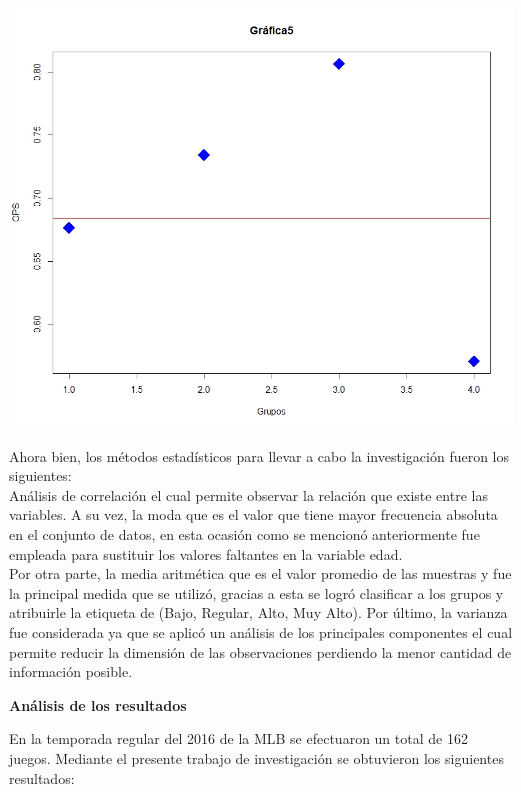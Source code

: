 \documentclass[11pt,letterpaper]{report}
\begin{document}
\begin{center}
    	\includegraphics[scale=0.4]{Grafica5.jpeg} 
    \end{center} \newpage
    
     Ahora bien, los métodos estadísticos para llevar a cabo la investigación fueron los siguientes: \\ 
     
     Análisis de correlación el cual permite observar la relación que existe entre las variables. A su vez, la moda que es el valor que tiene mayor frecuencia absoluta en el conjunto de datos, en esta ocasión como se mencionó anteriormente fue empleada para sustituir los valores faltantes en la variable edad. \\
     
     Por otra parte, la media aritmética que es el valor promedio de las muestras y fue la principal medida que se utilizó, gracias a esta se logró clasificar a los grupos y atribuirle la etiqueta de (Bajo, Regular, Alto, Muy Alto). 
     Por último, la varianza fue considerada ya que se aplicó un análisis de los principales componentes el cual permite reducir la dimensión de las observaciones perdiendo la menor cantidad de información posible. \\ 
     \begin{center}
     	\textbf{\large  Análisis de los resultados }
     \end{center} 
    
     En la temporada regular del 2016 de la MLB  se efectuaron un total de 162 juegos. Mediante el presente trabajo de investigación se obtuvieron los siguientes resultados: \\ 
     
\end{document}
